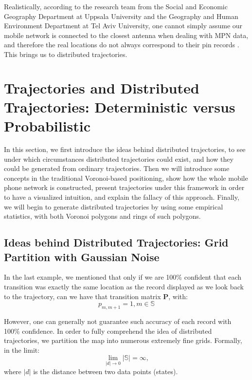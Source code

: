 \documentclass[12pt]{article}
\theoremstyle{definition}
\begin{document}
Realistically, according to the research team from the Social and Economic Geography Department at Uppsala University and the Geography and Human Environment Department at Tel Aviv University, one cannot simply assume our mobile network is connected to the closest antenna when dealing with MPN data, and therefore the real locations do not always correspond to their pin records \cite{closest_antenna_fallacy_2021}. This brings us to distributed trajectories. \newpage








\section{Trajectories and Distributed Trajectories: Deterministic versus Probabilistic}
In this section, we first introduce the ideas behind distributed trajectories, to see under which circumstances distributed trajectories could exist, and how they could be generated from ordinary trajectories. Then we will introduce some concepts in the traditional Voronoi-based positioning, show how the whole mobile phone network is constructed, present trajectories under this framework in order to have a visualized intuition, and explain the fallacy of this approach. Finally, we will begin to generate distributed trajectories by using some empirical statistics, with both Voronoi polygons and rings of such polygons.

\subsection{Ideas behind Distributed Trajectories: Grid Partition with Gaussian Noise}
In the last example, we mentioned that only if we are 100\% confident that each transition was exactly the same location as the record displayed as we look back to the trajectory, can we have that transition matrix \textbf{P}, with:\\
\begin{equation*} 
p_{m,m+1}=1, m \in \mathbb{S}
\end{equation*} 

However, one can generally not guarantee such accuracy of each record with 100\% confidence. In order to fully comprehend the idea of distributed trajectories, we partition the map into numerous extremely fine grids. Formally, in the limit:\\
\[ \lim_{\lvert d \rvert \to 0} {\left|\mathbb{S}\right|}=\infty,  \]
where \(|d|\) is the distance between two data points (states).
\end{document}
